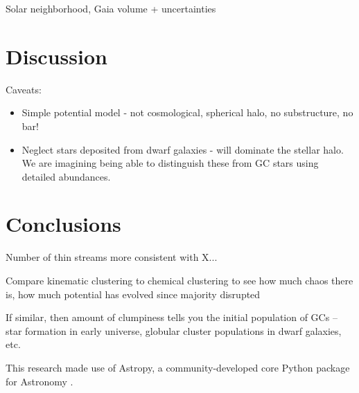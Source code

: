 \documentclass[manuscript, letterpaper]{aastex6}
\begin{document}
Solar neighborhood, Gaia volume + uncertainties

\section{Discussion}\label{sec:discussion}

Caveats:
\begin{itemize}
  \item Simple potential model - not cosmological, spherical halo, no
    substructure, no bar!
  \item Neglect stars deposited from dwarf galaxies - will dominate the stellar
    halo. We are imagining being able to distinguish these from GC stars using
    detailed abundances.
\end{itemize}

\section{Conclusions} \label{sec:conclusions}

Number of thin streams more consistent with X...

Compare kinematic clustering to chemical clustering to see how much chaos there
is, how much potential has evolved since majority disrupted

If similar, then amount of clumpiness tells you the initial population of GCs --
star formation in early universe, globular cluster populations in dwarf
galaxies, etc.

\acknowledgements
This research made use of
Astropy, a community-developed core Python package for Astronomy
\citep{Astropy-Collaboration:2013}.



\end{document}
